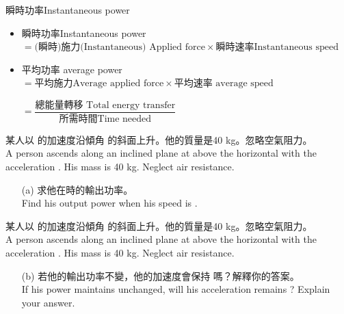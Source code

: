 \documentclass[beamer=true]{standalone}
\begin{document}
\begin{frame}{瞬時功率Instantaneous power}
    \begin{itemize}
        \setlength{\itemsep}{10pt}
        \item 瞬時功率Instantaneous power\\$=\textrm{(瞬時)施力(Instantaneous) Applied force}\times\textrm{瞬時速率Instantaneous speed}$
        \item 平均功率 average  power\\$=\textrm{平均施力Average applied force}\times\textrm{平均速率 average speed}$
        \item [] $=\dfrac{\textrm{總能量轉移 Total energy transfer}}{\textrm{所需時間Time needed}}$
    \end{itemize}
\end{frame}

\begin{eg}
    某人以  的加速度沿傾角  的斜面上升。他的質量是40 kg。忽略空氣阻力。 \\A person ascends along an inclined plane at  above the horizontal with the acceleration . His mass is 40 kg. Neglect air resistance.
    \begin{itemize}
        \item [(a)] 求他在時的輸出功率。 \\Find his output power when his speed is .
    \end{itemize}
\end{eg}
\begin{eg}
    某人以  的加速度沿傾角  的斜面上升。他的質量是40 kg。忽略空氣阻力。 \\A person ascends along an inclined plane at  above the horizontal with the acceleration . His mass is 40 kg. Neglect air resistance.
    \begin{itemize}
        \item [(b)] 若他的輸出功率不變，他的加速度會保持  嗎？解釋你的答案。 \\If his power maintains unchanged, will his acceleration remains ? Explain your answer.
    \end{itemize}
\end{eg}
\end{document}
